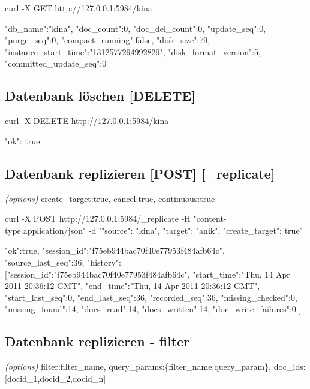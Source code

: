 \documentclass[19pt,landscape,twocolumn]{article}
\newcommand{\htmlverb}[1]{{[}\textbf{{#1}}{]}}
\newcommand{\brackets}[1]{{[}{#1}{]}}
\newcommand{\setparskip}{\setlength{\parskip}{-6mm}}
\newcommand{\resetparskip}{\setlength{\parskip}{1mm}}
\begin{document}
\begin{code}
curl -X GET http://127.0.0.1:5984/kina
\end{code}
\setparskip
\begin{response}
{"db_name":"kina",
 "doc_count":0,
 "doc_del_count":0,
 "update_seq":0,
 "purge_seq":0,
 "compact_running":false,
 "disk_size":79,
 "instance_start_time":"1312577294992829",
 "disk_format_version":5,
 "committed_update_seq":0}
\end{response}
\resetparskip

\subsection{Datenbank löschen \htmlverb{DELETE}}

\begin{code}
curl -X DELETE http://127.0.0.1:5984/kina
\end{code}
\setparskip
\begin{response}
{"ok": true}
\end{response}
\resetparskip

\subsection{Datenbank replizieren \htmlverb{POST} \htmlverb{\_replicate}}
\emph{(options)} create\_target:true, cancel:true, continuous:true

\begin{code}
curl -X POST http://127.0.0.1:5984/_replicate
     -H "content-type:application/json"
     -d '{"source": "kina",
          "target": "anik",
          "create_target": true}'
\end{code}
\setparskip
\begin{response}
{"ok":true, "session_id":"f75eb944bac70f40e77953f484afb64c",
 "source_last_seq":36, "history":
   [{"session_id":"f75eb944bac70f40e77953f484afb64c",
     "start_time":"Thu, 14 Apr 2011 20:36:12 GMT",
     "end_time":"Thu, 14 Apr 2011 20:36:12 GMT",
     "start_last_seq":0,
     "end_last_seq":36,
     "recorded_seq":36,
     "missing_checked":0,
     "missing_found":14,
     "docs_read":14,
     "docs_written":14,
     "doc_write_failures":0
  }]
}
\end{response}
\resetparskip

\subsection{Datenbank replizieren - filter}
\emph{(options)} filter:filter\_name, query\_params:\{filter\_name:query\_param\},\newline
doc\_ids: \brackets{docid\_1,docid\_2,docid\_n} \newline
\end{document}
